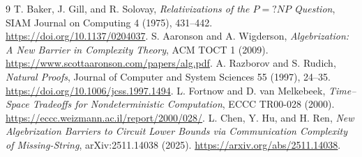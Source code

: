 \documentclass[11pt]{article}
\begin{document}
\begin{thebibliography}{9}
 T. Baker, J. Gill, and R. Solovay,
\emph{Relativizations of the $P=?NP$ Question}, SIAM Journal on Computing 4
(1975), 431--442. \url{https://doi.org/10.1137/0204037}.
 S. Aaronson and A. Wigderson,
\emph{Algebrization: A New Barrier in Complexity Theory}, ACM TOCT 1 (2009).
\url{https://www.scottaaronson.com/papers/alg.pdf}.
 A. Razborov and S. Rudich, \emph{Natural Proofs}, Journal of
Computer and System Sciences 55 (1997), 24--35.
\url{https://doi.org/10.1006/jcss.1997.1494}.
 L. Fortnow and D. van Melkebeek,
\emph{Time--Space Tradeoffs for Nondeterministic Computation}, ECCC TR00-028
(2000). \url{https://eccc.weizmann.ac.il/report/2000/028/}.
 L. Chen, Y. Hu, and H. Ren,
\emph{New Algebrization Barriers to Circuit Lower Bounds via Communication
Complexity of Missing-String}, arXiv:2511.14038 (2025).
\url{https://arxiv.org/abs/2511.14038}.
\end{thebibliography}

\end{document}
